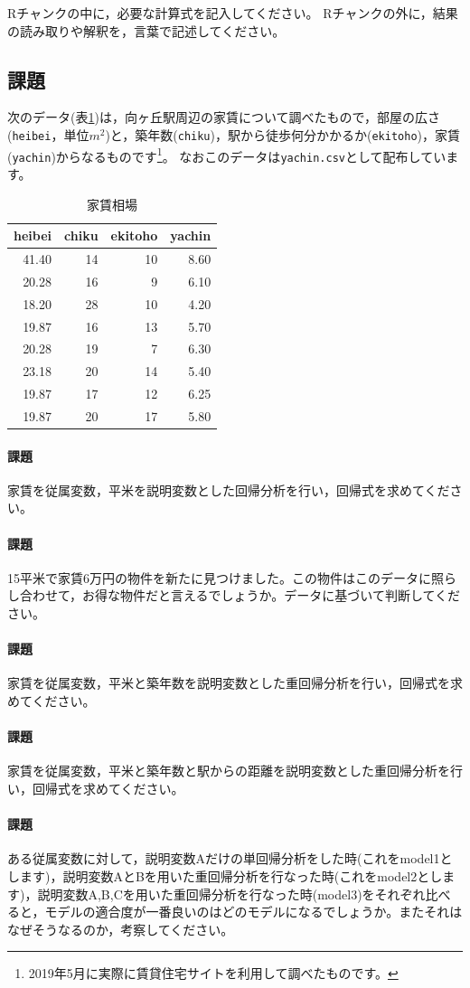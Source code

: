 \documentclass{ltjbook}
\begin{document}
Rチャンクの中に，必要な計算式を記入してください。
Rチャンクの外に，結果の読み取りや解釈を，言葉で記述してください。



\subsection{課題}
次のデータ(表\ref{tbl::ex11_01})は，向ヶ丘駅周辺の家賃について調べたもので，部屋の広さ(\verb|heibei|，単位$m^2$)と，築年数(\verb|chiku|)，駅から徒歩何分かかるか(\verb|ekitoho|)，家賃(\verb|yachin|)からなるものです\footnote{2019年5月に実際に賃貸住宅サイトを利用して調べたものです。}。
なおこのデータは\texttt{yachin.csv}として配布しています。
\begin{table}[ht]
	\caption{家賃相場}
	\centering
	\begin{tabular}[t]{rrrr}
		\hline
		heibei & chiku & ekitoho & yachin \\
		\hline
		41.40  & 14    & 10      & 8.60   \\
		20.28  & 16    & 9       & 6.10   \\
		18.20  & 28    & 10      & 4.20   \\
		19.87  & 16    & 13      & 5.70   \\
		20.28  & 19    & 7       & 6.30   \\
		23.18  & 20    & 14      & 5.40   \\
		19.87  & 17    & 12      & 6.25   \\
		19.87  & 20    & 17      & 5.80   \\
		\hline
	\end{tabular}
	\label{tbl::ex11_01}
\end{table}
\paragraph{課題}家賃を従属変数，平米を説明変数とした回帰分析を行い，回帰式を求めてください。
\paragraph{課題}15平米で家賃6万円の物件を新たに見つけました。この物件はこのデータに照らし合わせて，お得な物件だと言えるでしょうか。データに基づいて判断してください。
\paragraph{課題}家賃を従属変数，平米と築年数を説明変数とした重回帰分析を行い，回帰式を求めてください。
\paragraph{課題}家賃を従属変数，平米と築年数と駅からの距離を説明変数とした重回帰分析を行い，回帰式を求めてください。
\paragraph{課題}ある従属変数に対して，説明変数Aだけの単回帰分析をした時(これをmodel1とします)，説明変数AとBを用いた重回帰分析を行なった時(これをmodel2とします)，説明変数A,B,Cを用いた重回帰分析を行なった時(model3)をそれぞれ比べると，モデルの適合度が一番良いのはどのモデルになるでしょうか。またそれはなぜそうなるのか，考察してください。
\end{document}
